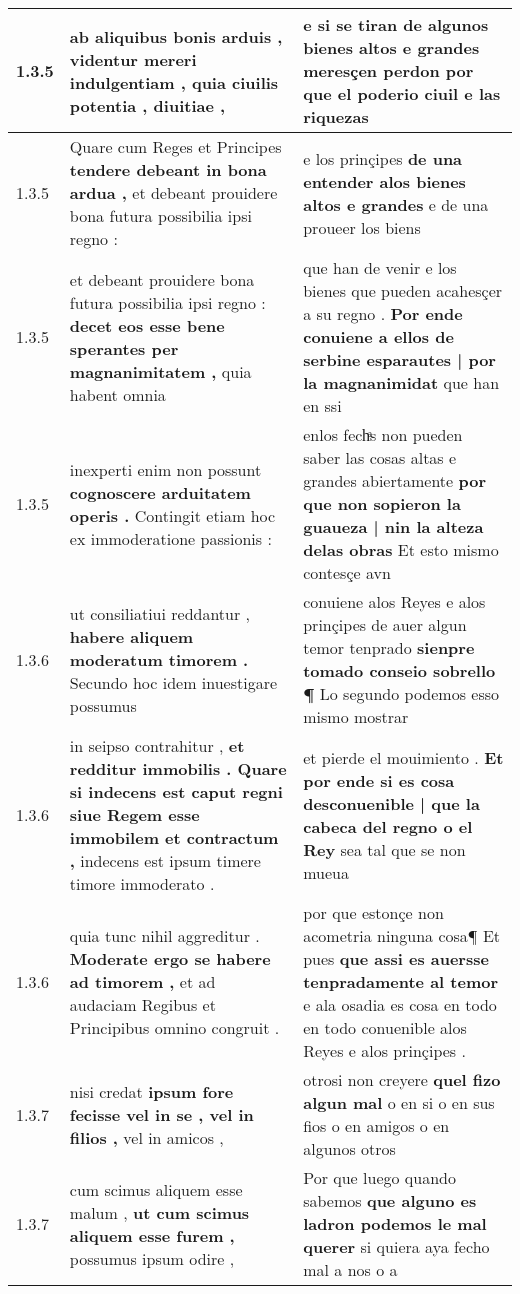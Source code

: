 \begin{tabular}{|p{1cm}|p{6.5cm}|p{6.5cm}|}
1.3.5 & ab aliquibus bonis arduis , \textbf{ videntur mereri indulgentiam , } quia ciuilis potentia , diuitiae , & e si se tiran de algunos bienes altos \textbf{ e grandes meresçen perdon } por que el poderio ciuil e las riquezas \\\hline
1.3.5 & Quare cum Reges et Principes \textbf{ tendere debeant in bona ardua , } et debeant prouidere bona futura possibilia ipsi regno : & e los prinçipes \textbf{ de una entender alos bienes altos e grandes } e de una proueer los biens \\\hline
1.3.5 & et debeant prouidere bona futura possibilia ipsi regno : \textbf{ decet eos esse bene sperantes per magnanimitatem , } quia habent omnia & que han de venir e los bienes que pueden acahesçer a su regno . \textbf{ Por ende conuiene a ellos de serbine esparautes | por la magnanimidat } que han en ssi \\\hline
1.3.5 & inexperti enim non possunt \textbf{ cognoscere arduitatem operis . } Contingit etiam hoc ex immoderatione passionis : & enlos fechͣs non pueden saber las cosas altas e grandes abiertamente \textbf{ por que non sopieron la guaueza | nin la alteza delas obras } Et esto mismo contesçe avn \\\hline
1.3.6 & ut consiliatiui reddantur , \textbf{ habere aliquem moderatum timorem . } Secundo hoc idem inuestigare possumus & conuiene alos Reyes e alos prinçipes de auer algun temor tenprado \textbf{ sienpre tomado conseio sobrello ¶ } Lo segundo podemos esso mismo mostrar \\\hline
1.3.6 & in seipso contrahitur , \textbf{ et redditur immobilis . Quare si indecens est caput regni siue Regem esse immobilem et contractum , } indecens est ipsum timere timore immoderato . & et pierde el mouimiento . \textbf{ Et por ende si es cosa desconuenible | que la cabeca del regno o el Rey } sea tal que se non mueua \\\hline
1.3.6 & quia tunc nihil aggreditur . \textbf{ Moderate ergo se habere ad timorem , } et ad audaciam Regibus et Principibus omnino congruit . & por que estonçe non acometria ninguna cosa¶ Et pues \textbf{ que assi es auersse tenpradamente al temor } e ala osadia es cosa en todo en todo conuenible alos Reyes e alos prinçipes . \\\hline
1.3.7 & nisi credat \textbf{ ipsum fore fecisse vel in se , vel in filios , } vel in amicos , & otrosi non creyere \textbf{ quel fizo algun mal } o en si o en sus fios o en amigos o en algunos otros \\\hline
1.3.7 & cum scimus aliquem esse malum , \textbf{ ut cum scimus aliquem esse furem , } possumus ipsum odire , & Por que luego quando sabemos \textbf{ que alguno es ladron podemos le mal querer } si quiera aya fecho mal a nos o a \\\hline

\end{tabular}
